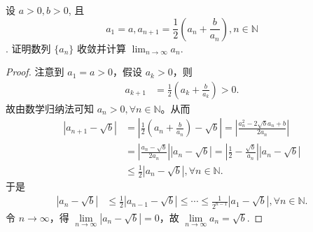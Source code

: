 \documentclass[lang=cn,newtx,10pt,scheme=chinese]{../Template/elegantbook}
\begin{document}
\begin{example}
设 $a > 0, b > 0$, 且 \[a_1 = a, a_{n+1} = \frac{1}{2} \left( a_n + \frac{b}{a_n} \right), n \in \mathbb{N}\].
证明数列 $\{a_n\}$ 收敛并计算 $\lim_{n \to \infty} a_n$.
\end{example}
\begin{proof}
注意到 $a_1 = a > 0$，假设 $a_k > 0$，则
\begin{align*}
a_{k+1} &= \frac{1}{2} \left( a_k + \frac{b}{a_k} \right) > 0.
\end{align*}
故由数学归纳法可知 $a_n > 0, \forall n \in \mathbb{N}$。从而
\begin{align*}
\left| a_{n+1} - \sqrt{b} \right| &= \left| \frac{1}{2} \left( a_n + \frac{b}{a_n} \right) - \sqrt{b} \right| = \left| \frac{a_n^2 - 2\sqrt{b}a_n + b}{2a_n} \right| \\
&= \left| \frac{a_n - \sqrt{b}}{2a_n} \right| \left| a_n - \sqrt{b} \right| = \left| \frac{1}{2} - \frac{\sqrt{b}}{a_n} \right| \left| a_n - \sqrt{b} \right| \\
&\leqslant \frac{1}{2} \left| a_n - \sqrt{b} \right|, \forall n \in \mathbb{N}.
\end{align*}
于是
\begin{align*}
\left| a_n - \sqrt{b} \right| &\leqslant \frac{1}{2} \left| a_{n-1} - \sqrt{b} \right| \leqslant \cdots \leqslant \frac{1}{2^{n-1}} \left| a_1 - \sqrt{b} \right|, \forall n \in \mathbb{N}.
\end{align*}
令 $n \rightarrow \infty$，得 $\underset{n \to \infty}{\lim} \left| a_n - \sqrt{b} \right| = 0$，故 $\underset{n \to \infty}{\lim} a_n = \sqrt{b}$.

\end{proof}
\end{document}
